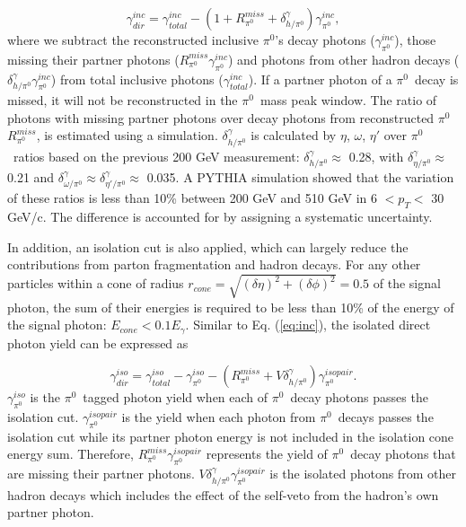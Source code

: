 \documentclass[twocolumn,letterpaper,aps,prl,longbibliography,superscriptaddress,floatfix]{revtex4-2}
\newcommand{\pizero}{\ensuremath{\pi^0}}
\begin{document}
\begin{equation} \label{eq:inc}
\gamma_{dir}^{inc} = \gamma_{total}^{inc} - \left( 1 + R_{\pi^0}^{miss} + \delta_{h/\pi^0}^{\gamma} \right) \gamma_{\pi^0}^{inc},
\end{equation}
where we subtract the reconstructed inclusive \pizero's decay photons ($\gamma_{\pi^0}^{inc}$), those missing their partner photons ($R_{\pi^0}^{miss}\gamma_{\pi^0}^{inc}$) and photons from other hadron decays ($\delta_{h/\pi^0}^{\gamma}\gamma_{\pi^0}^{inc}$) from total inclusive photons ($\gamma_{total}^{inc}$). If a partner photon of a \pizero\ decay is missed, it will not be reconstructed in the \pizero\ mass peak window. The ratio of photons with missing partner photons over decay photons from reconstructed \pizero\, $R_{\pi^0}^{miss}$, is estimated using a simulation.
$\delta_{h/\pi^0}^{\gamma}$ is calculated by $\eta$, $\omega$, $\eta'$ over \pizero\ ratios based on the previous 200 GeV measurement\cite{PhysRevD.83.052004}: $\delta_{h/\pi^0}^{\gamma} \approx$ 0.28, with $\delta_{\eta/\pi^0}^{\gamma} \approx$ 0.21 and $\delta_{\omega/\pi^0}^{\gamma} \approx \delta_{\eta'/\pi^0}^{\gamma}  \approx$ 0.035. A PYTHIA \cite{Sjostrand:2006za} simulation showed that the variation of these ratios is less than 10\% between 200 GeV and 510 GeV in 6 $< p_T <$ 30 GeV/c. The difference is accounted for by assigning a systematic uncertainty.

In addition, an isolation cut is also applied, which can largely reduce the contributions from parton fragmentation and hadron decays. For any other particles within a cone of radius $r_{cone} = \sqrt{(\delta\eta)^2 + (\delta\phi)^2} = 0.5$ of the signal photon, the sum of their energies is required to be less than 10\% of the energy of the signal photon: $E_{cone} < 0.1 E_{\gamma}$. Similar to Eq. (\ref{eq:inc}), the isolated direct photon yield can be expressed as


\begin{equation} \label{eq:iso}
\gamma_{dir}^{iso} = \gamma_{total}^{iso} - \gamma_{\pi^0}^{iso} - \left( R_{\pi^0}^{miss} + V\delta_{h/\pi^0}^{\gamma} \right) \gamma_{\pi^0}^{isopair}.
\end{equation}
$\gamma_{\pi^0}^{iso}$ is the \pizero \ tagged photon yield when each of \pizero\ decay photons passes the isolation cut. $\gamma_{\pi^0}^{isopair}$ is the yield when each photon from \pizero\ decays passes the isolation cut while its partner photon energy is not included in the isolation cone energy sum. Therefore, $R_{\pi^0}^{miss}\gamma_{\pi^0}^{isopair}$ represents the yield of \pizero\ decay photons that are missing their partner photons. $V\delta_{h/\pi^0}^{\gamma}\gamma_{\pi^0}^{isopair}$ is the isolated photons from other hadron decays which includes the effect of the self-veto from the hadron's own partner photon.
\end{document}

